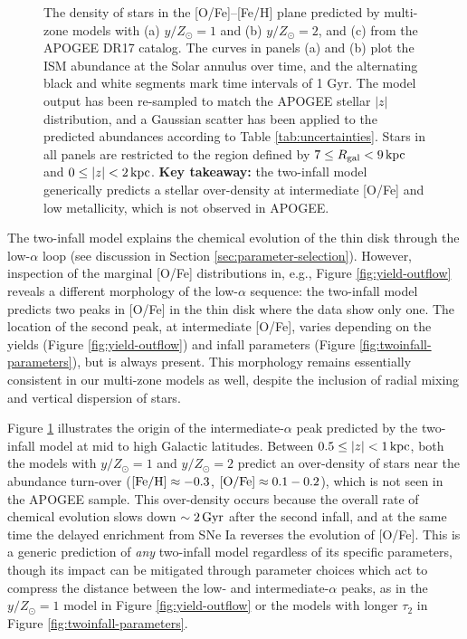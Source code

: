 \documentclass[twocolumn,twocolappendix,linenumbers]{aastex631}
\newcommand{\mathFeH}{{\rm [Fe/H]}}
\newcommand{\mathOFe}{{\rm [O/Fe]}}
\newcommand{\kpc}{\,{\rm kpc}}
\begin{document}
\begin{figure}
    \caption{The density of stars in the [O/Fe]--[Fe/H] plane predicted by multi-zone models with (a) $y/Z_\odot=1$ and (b) $y/Z_\odot=2$, and (c) from the APOGEE DR17 catalog. The curves in panels (a) and (b) plot the ISM abundance at the Solar annulus over time, and the alternating black and white segments mark time intervals of {1 Gyr}. The model output has been re-sampled to match the APOGEE stellar $|z|$ distribution, and a Gaussian scatter has been applied to the predicted abundances according to Table \ref{tab:uncertainties}. Stars in all panels are restricted to the region defined by $7\leq R_{\rm gal}< 9\kpc$ and $0\leq|z|<2\kpc$. {\bf Key takeaway:} the two-infall model generically predicts a stellar over-density at intermediate [O/Fe] and low metallicity, which is not observed in APOGEE.}
    \label{fig:ofe-feh-density}
\end{figure}

The two-infall model explains the chemical evolution of the thin disk through the low-$\alpha$ loop (see discussion in Section \ref{sec:parameter-selection}). However, inspection of the marginal [O/Fe] distributions in, e.g., Figure \ref{fig:yield-outflow} reveals a different morphology of the low-$\alpha$ sequence: the two-infall model predicts two peaks in [O/Fe] in the thin disk where the data show only one. The location of the second peak, at intermediate [O/Fe], varies depending on the yields (Figure \ref{fig:yield-outflow}) and infall parameters (Figure \ref{fig:twoinfall-parameters}), but is always present. This morphology remains essentially consistent in our multi-zone models as well, despite the inclusion of radial mixing and vertical dispersion of stars.

Figure \ref{fig:ofe-feh-density} illustrates the origin of the intermediate-$\alpha$ peak predicted by the two-infall model at mid to high Galactic latitudes. Between $0.5\leq|z|<1\kpc$, both the models with $y/Z_\odot=1$ and $y/Z_\odot=2$ predict an over-density of stars near the abundance turn-over ($\mathFeH\approx-0.3$, $\mathOFe\approx0.1-0.2$), which is not seen in the APOGEE sample. This over-density occurs because the overall rate of chemical evolution slows down $\sim2\,{\rm Gyr}$ after the second infall, and at the same time the delayed enrichment from SNe Ia reverses the evolution of [O/Fe]. This is a generic prediction of {\it any} two-infall model regardless of its specific parameters, though its impact can be mitigated through parameter choices which act to compress the distance between the low- and intermediate-$\alpha$ peaks, as in the $y/Z_\odot=1$ model in Figure \ref{fig:yield-outflow} or the models with longer $\tau_2$ in Figure \ref{fig:twoinfall-parameters}.
\end{document}
